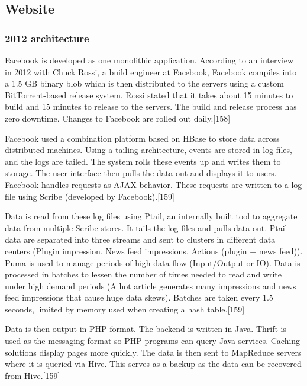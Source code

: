 \documentclass[12pt]{article}
\begin{document}
\subsection{Website}

\subsubsection{2012 architecture}

Facebook is developed as one monolithic application. According to an interview in 2012 with Chuck Rossi, a build engineer at Facebook, Facebook compiles into a 1.5 GB binary blob which is then distributed to the servers using a custom BitTorrent-based release system. Rossi stated that it takes about 15 minutes to build and 15 minutes to release to the servers. The build and release process has zero downtime. Changes to Facebook are rolled out daily.[158]

Facebook used a combination platform based on HBase to store data across distributed machines. Using a tailing architecture, events are stored in log files, and the logs are tailed. The system rolls these events up and writes them to storage. The user interface then pulls the data out and displays it to users. Facebook handles requests as AJAX behavior. These requests are written to a log file using Scribe (developed by Facebook).[159]

Data is read from these log files using Ptail, an internally built tool to aggregate data from multiple Scribe stores. It tails the log files and pulls data out. Ptail data are separated into three streams and sent to clusters in different data centers (Plugin impression, News feed impressions, Actions (plugin + news feed)). Puma is used to manage periods of high data flow (Input/Output or IO). Data is processed in batches to lessen the number of times needed to read and write under high demand periods (A hot article generates many impressions and news feed impressions that cause huge data skews). Batches are taken every 1.5 seconds, limited by memory used when creating a hash table.[159]

Data is then output in PHP format. The backend is written in Java. Thrift is used as the messaging format so PHP programs can query Java services. Caching solutions display pages more quickly. The data is then sent to MapReduce servers where it is queried via Hive. This serves as a backup as the data can be recovered from Hive.[159] 
\end{document}
